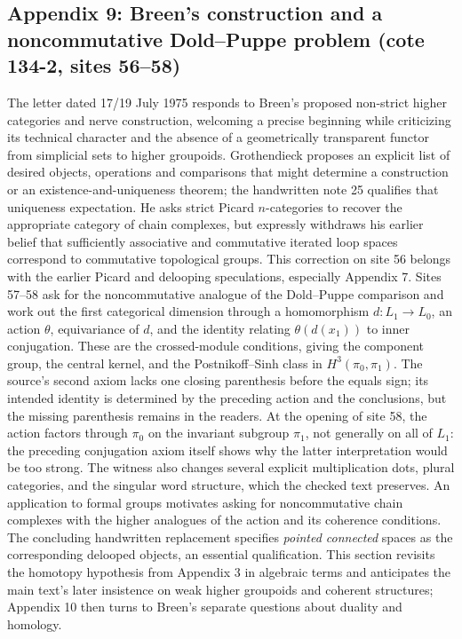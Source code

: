 \subsection*{Appendix 9: Breen's construction and a noncommutative Dold--Puppe problem (cote 134-2, sites 56--58)}
The letter dated 17/19 July 1975 responds to Breen's proposed non-strict higher categories and nerve construction, welcoming a precise beginning while criticizing its technical character and the absence of a geometrically transparent functor from simplicial sets to higher groupoids. Grothendieck proposes an explicit list of desired objects, operations and comparisons that might determine a construction or an existence-and-uniqueness theorem; the handwritten note 25 qualifies that uniqueness expectation. He asks strict Picard $n$-categories to recover the appropriate category of chain complexes, but expressly withdraws his earlier belief that sufficiently associative and commutative iterated loop spaces correspond to commutative topological groups. This correction on site 56 belongs with the earlier Picard and delooping speculations, especially Appendix 7. Sites 57--58 ask for the noncommutative analogue of the Dold--Puppe comparison and work out the first categorical dimension through a homomorphism $d:L_1\to L_0$, an action $\theta$, equivariance of $d$, and the identity relating $\theta(d(x_1))$ to inner conjugation. These are the crossed-module conditions, giving the component group, the central kernel, and the Postnikoff--Sinh class in $H^3(\pi_0,\pi_1)$. The source's second axiom lacks one closing parenthesis before the equals sign; its intended identity is determined by the preceding action and the conclusions, but the missing parenthesis remains in the readers. At the opening of site 58, the action factors through $\pi_0$ on the invariant subgroup $\pi_1$, not generally on all of $L_1$: the preceding conjugation axiom itself shows why the latter interpretation would be too strong. The witness also changes several explicit multiplication dots, plural categories, and the singular word structure, which the checked text preserves. An application to formal groups motivates asking for noncommutative chain complexes with the higher analogues of the action and its coherence conditions. The concluding handwritten replacement specifies \emph{pointed connected} spaces as the corresponding delooped objects, an essential qualification. This section revisits the homotopy hypothesis from Appendix 3 in algebraic terms and anticipates the main text's later insistence on weak higher groupoids and coherent structures; Appendix 10 then turns to Breen's separate questions about duality and homology.

